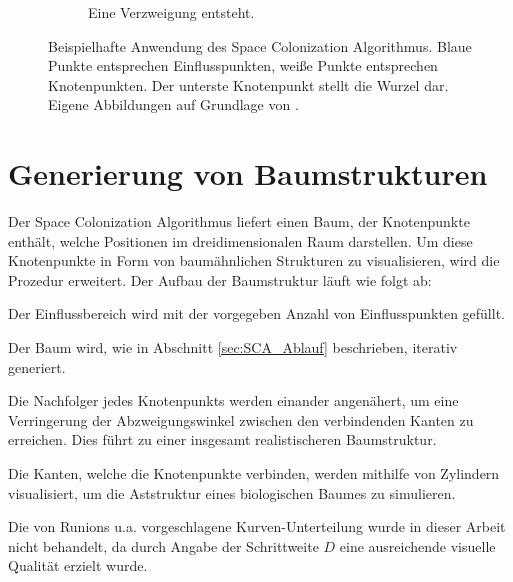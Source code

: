 \begin{figure} [hbtp]
\begin{subfigure}[t]{.31\textwidth}
		\caption{Eine Verzweigung entsteht.}
		\label{subfig:SCA_Basic8}
	\end{subfigure}
	\caption{Beispielhafte Anwendung des Space Colonization Algorithmus. Blaue Punkte entsprechen Einflusspunkten, weiße Punkte entsprechen Knotenpunkten. Der unterste Knotenpunkt stellt die Wurzel dar. Eigene Abbildungen auf Grundlage von \cite[Abb. 2]{SpaceColonizationAlgorithm:07}.}\label{fig:SCA_Basic}
	
\end{figure}


\section{Generierung von Baumstrukturen}
\label{sec:GenerierungBaumstrukturen}
Der Space Colonization Algorithmus liefert einen Baum, der Knotenpunkte enthält, welche Positionen im dreidimensionalen Raum darstellen. Um diese Knotenpunkte in Form von baumähnlichen Strukturen zu visualisieren, wird die Prozedur erweitert. Der Aufbau der Baumstruktur läuft wie folgt ab:

\begin{description}[labelindent]
	\item[\boldmath$1.$] Der Einflussbereich wird mit der vorgegeben Anzahl von Einflusspunkten gefüllt. \cite[Abschn. 2]{SpaceColonizationAlgorithm:07} \\

	\item[\boldmath$2.$] Der Baum wird, wie in Abschnitt \ref{sec:SCA_Ablauf} beschrieben, iterativ generiert. \cite[Abschn. 2]{SpaceColonizationAlgorithm:07} \\

	\item[\boldmath$3.$] Die Nachfolger jedes Knotenpunkts werden einander angenähert, um eine Verringerung der Abzweigungswinkel zwischen den verbindenden Kanten zu erreichen. Dies führt zu einer insgesamt realistischeren Baumstruktur. \cite[Abschn. 2]{SpaceColonizationAlgorithm:07} \\
	
	\item[\boldmath$4.$] Die Kanten, welche die Knotenpunkte verbinden, werden mithilfe von Zylindern visualisiert, um die Aststruktur eines biologischen Baumes zu simulieren. \cite[Abschn. 2]{SpaceColonizationAlgorithm:07} 
	
\end{description}

Die von Runions u.a. \cite{SpaceColonizationAlgorithm:07} vorgeschlagene Kurven-Unterteilung \cite[Abschn. 2]{SpaceColonizationAlgorithm:07} wurde in dieser Arbeit nicht behandelt, da durch Angabe der Schrittweite $D$ eine ausreichende visuelle Qualität erzielt wurde.

